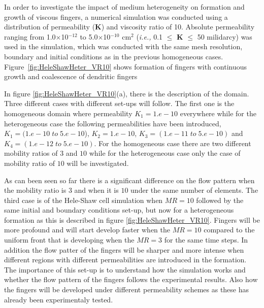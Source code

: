 \documentclass[preprint,authoryear,12pt]{elsarticle}
\newcommand{\ie}{{\it i.e., }}
\begin{document}
\medskip
In order to investigate the impact of medium heterogeneity on formation and growth of viscous fingers, a numerical simulation was conducted using a distribution of permeability ({\bf K}) and viscosity ratio of 10. Absolute permeability ranging from 1.0$\times$10$^{-12}$ to 5.0$\times$10$^{-10}$ cm$^{2}$ (\ie 0.1 $\le$ {\bf K} $\le$ 50 milidarcy) was used in the simulation, which was conducted with the same mesh resolution, boundary and initial conditions as in the previous homogeneous cases. Figure~\ref{fig:HeleShawHeter_VR10} shows formation of fingers with continuous growth and coalescence of  dendritic fingers
 
In figure \ref{fig:HeleShawHeter_VR10}(a), there is the description of the domain. Three different cases with different set-ups will follow. The first one is the homogeneous domain where permeability $K_{1}=1.e-10$ everywhere while for the heterogeneous case the following permeabilities have been introduced, $K_{1}=(1.e-10 \;to\; 5.e-10$), $K_{2}=1.e-10$, $K_{3}=(1.e-11 \;to\; 5.e-10)$ and $K_{4}=(1.e-12 \;to\; 5.e-10)$. For the homogeneous case there are  two different mobility ratios of $3$ and $10$ while for the heterogeneous case only the case of  mobility ratio of $10$ will be investigated. 
  
\medskip
As can been seen so far there is %
a significant difference on the flow pattern when the mobility ratio is $3$ and when it is $10$ under the same number of elements. %
The third case is of the Hele-Shaw cell simulation when $MR=10$ followed by the same initial and boundary conditions set-up, but now for a heterogeneous formation as this is described in figure \ref{fig:HeleShawHeter_VR10}. %
 Fingers will be more profound and will start develop faster when the $MR=10$ compared to the uniform front that is developing when the $MR=3$ for the same time steps. In addition the flow patter of the fingers will be sharper and more intense when different regions with different permeabilities are introduced in the formation. The importance of this set-up is to understand how the simulation works and whether the flow pattern of the fingers follows the experimental results. Also how the fingers will be developed under different permeability schemes as these has already been experimentaly tested.  
\end{document}
